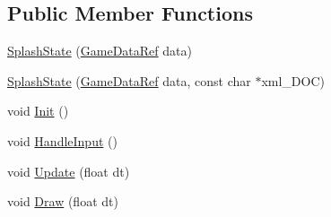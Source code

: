 \subsection*{Public Member Functions}
\begin{DoxyCompactItemize}
\item 
\hyperlink{classSekander_1_1SplashState_ae341ef8552453a1d343dcad68de101b5}{Splash\+State} (\hyperlink{namespaceSekander_a1d69b002ba2d23020901c28f0def5e16}{Game\+Data\+Ref} data)
\item 
\hyperlink{classSekander_1_1SplashState_aeb0bbd0553d10ed561166578b3fba993}{Splash\+State} (\hyperlink{namespaceSekander_a1d69b002ba2d23020901c28f0def5e16}{Game\+Data\+Ref} data, const char $\ast$xml\+\_\+\+D\+OC)
\item 
void \hyperlink{classSekander_1_1SplashState_adefc71fa2623180deda8391d4e64b04c}{Init} ()
\item 
void \hyperlink{classSekander_1_1SplashState_a70b45699149208c755d95d1ef3bdb202}{Handle\+Input} ()
\item 
void \hyperlink{classSekander_1_1SplashState_ac7121b90b97b7d9cdb5774bdc0c6cc2d}{Update} (float dt)
\item 
void \hyperlink{classSekander_1_1SplashState_ad372f3712cd5d3207e44a50dc70bed46}{Draw} (float dt)
\end{DoxyCompactItemize}
